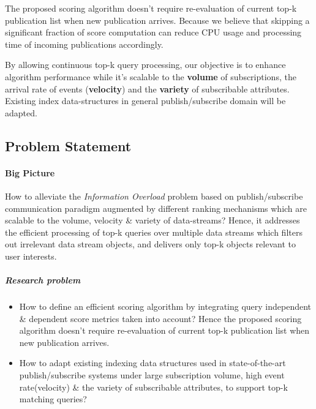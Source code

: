 \documentclass[a4paper,12pt,oneside]{book}
\theoremstyle{definition}
\theoremstyle{remark}
\begin{document}
The proposed scoring algorithm doesn't require re-evaluation of current top-k publication list when new publication arrives. Because we believe that skipping a significant fraction of score computation can reduce CPU usage and processing time of incoming publications accordingly.

By allowing continuous top-k query processing, our objective is to enhance algorithm performance while it's scalable to the \textbf{volume} of subscriptions, the arrival rate of events (\textbf{velocity}) and the \textbf{variety} of subscribable attributes. Existing index data-structures in general publish/subscribe domain will be adapted. 

\subsection{Problem Statement}
\paragraph*{Big Picture}
How to alleviate the \emph{Information Overload} problem based on publish/subscribe communication paradigm augmented by different ranking mechanisms which are scalable to the volume, velocity \& variety of data-streams? Hence, it addresses the efficient processing of top-k queries over multiple data streams which filters out irrelevant data stream objects, and delivers only top-k objects relevant to user interests. 
\subparagraph*{Research problem}
\begin{itemize}
\item How to define an efficient scoring algorithm by integrating query independent \& dependent score metrics taken into account? Hence the proposed scoring algorithm doesn't require re-evaluation of current top-k publication list when new publication arrives.
\item How to adapt existing indexing data structures used in state-of-the-art publish/subscribe systems under large subscription volume, high event rate(velocity) \& the variety of subscribable attributes, to support top-k matching queries?
\end{itemize}
\end{document}
